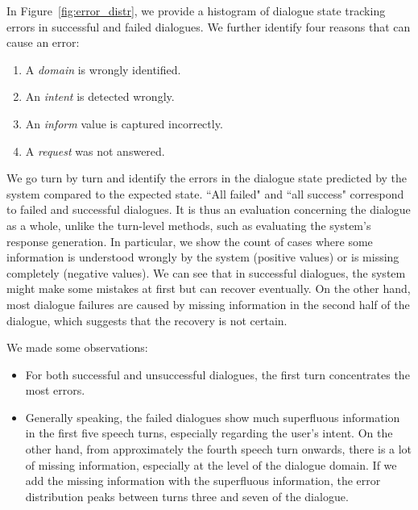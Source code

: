 In Figure~\ref{fig:error_distr}, we provide a histogram of dialogue state tracking errors in successful and failed dialogues.
We further identify four reasons that can cause an error:
\begin{enumerate}
    \item A \emph{domain} is wrongly identified.
    \item An \emph{intent} is detected wrongly.
    \item An \emph{inform} value is captured incorrectly.
    \item A \emph{request} was not answered.
\end{enumerate}
We go turn by turn and identify the errors in the dialogue state predicted by the system compared to the expected state.
``All failed" and ``all success" correspond to failed and successful dialogues.
It is thus an evaluation concerning the dialogue as a whole, unlike the turn-level methods, such as evaluating the system's response generation.
In particular, we show the count of cases where some information is understood wrongly by the system (positive values) or is missing completely (negative values).
We can see that in successful dialogues, the system might make some mistakes at first but can recover eventually.
On the other hand, most dialogue failures are caused by missing information in the second half of the dialogue, which suggests that the recovery is not certain.

We made some observations:
\begin{itemize}
    \item For both successful and unsuccessful dialogues, the first turn concentrates the most errors.
    
    \item Generally speaking, the failed dialogues show much superfluous information in the first five speech turns, especially regarding the user's intent. On the other hand, from approximately the fourth speech turn onwards, there is a lot of missing information, especially at the level of the dialogue domain. If we add the missing information with the superfluous information, the error distribution peaks between turns three and seven of the dialogue. 
\end{itemize}

